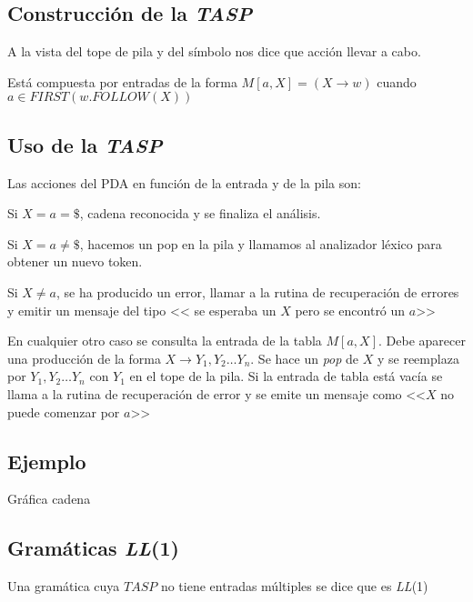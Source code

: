 \subsection{Construcción de la \textit{TASP}}


A la vista del tope de pila y del símbolo nos dice que acción llevar a cabo.

Está compuesta por entradas de la forma $M[a,X]=(X\rightarrow w)$        cuando 
          $a\in FIRST(w.FOLLOW(X))$


 
\subsection{Uso de la \textit{TASP}}

Las acciones del PDA en función de la entrada y de
la pila son:

  Si $X=a=\$$, cadena reconocida y se finaliza el análisis.
  
  Si $X=a\neq \$$, hacemos un pop en la pila y llamamos al analizador léxico para obtener un nuevo token.
  
  Si $X\neq a$, se ha producido un error, llamar a la rutina de recuperación de errores y emitir un mensaje del tipo << se esperaba un $X$ pero se encontró un $ a $>>
  
  En cualquier otro caso se consulta la entrada de la tabla $M[a,X]$. Debe aparecer una producción de la forma $ X\rightarrow Y_{1},Y_{2}\ldots  Y_{n}$. Se hace un \textit{pop} de $ X$ y se reemplaza por $Y_{1},Y_{2}\ldots Y_{n}$ con $Y_{1}$ en el tope de la pila.
Si la entrada de tabla está vacía se llama a la rutina de recuperación de error y se emite un mensaje como <<$X$ no puede comenzar por $a$>>

\subsection{Ejemplo}



{\LARGE Gráfica  cadena}


\subsection{Gramáticas \textit{LL}(1)}

Una gramática cuya $TASP$ no tiene entradas múltiples se dice que es \textit{LL}(1)

